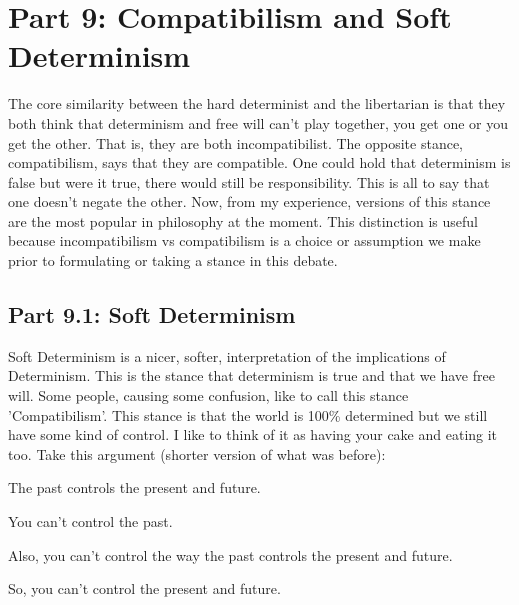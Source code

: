 \chapter{Part 9: Compatibilism and Soft Determinism}
The core similarity between the hard determinist and the libertarian is that they both think that determinism and free will can’t play together, you get one or you get the other. That is, they are both incompatibilist. The opposite stance, compatibilism, says that they are compatible. One could hold that determinism is false but were it true, there would still be responsibility. This is all to say that one doesn't negate the other. Now, from my experience, versions of this stance are the most popular in philosophy at the moment. This distinction is useful because incompatibilism vs compatibilism is a choice or assumption we make prior to formulating or taking a stance in this debate. 

\section{Part 9.1: Soft Determinism}

Soft Determinism is a nicer, softer, interpretation of the implications of Determinism. This is the stance that determinism is true and that we have free will. Some people, causing some confusion, like to call this stance 'Compatibilism'. This stance is that the world is 100\% determined but we still have some kind of control. I like to think of it as having your cake and eating it too. Take this argument (shorter version of what was before):

\begin{earg}
    \item[]The past controls the present and future.
    \item[]You can't control the past.
    \item[]Also, you can't control the way the past controls the present and future.
    \item[]So, you can't control the present and future.
\end{earg}

